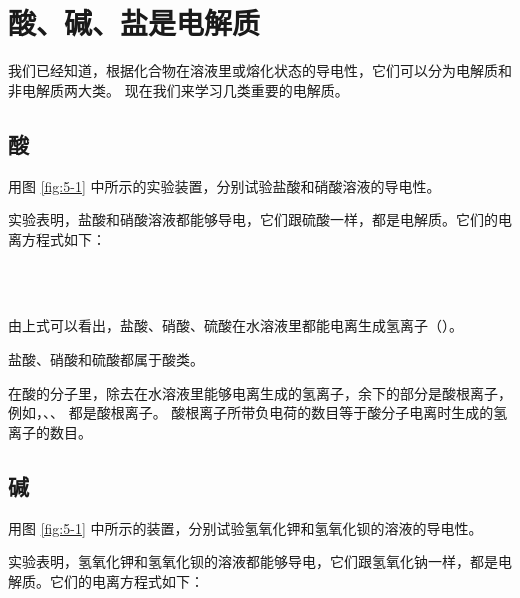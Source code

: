 \section{酸、碱、盐是电解质}\label{sec:5-2}

我们已经知道，根据化合物在溶液里或熔化状态的导电性，它们可以分为电解质和非电解质两大类。
现在我们来学习几类重要的电解质。

\subsection{酸}

\begin{shiyan}
    用图 \ref{fig:5-1} 中所示的实验装置，分别试验盐酸和硝酸溶液的导电性。
\end{shiyan}

实验表明，盐酸和硝酸溶液都能够导电，它们跟硫酸一样，都是电解质。它们的电离方程式如下：
\begin{fangchengshi}
     \\
     \\
\end{fangchengshi}

由上式可以看出，盐酸、硝酸、硫酸在水溶液里都能电离生成氢离子（）。

盐酸、硝酸和硫酸都属于酸类。

在酸的分子里，除去在水溶液里能够电离生成的氢离子，余下的部分是酸根离子，
例如，、、 都是酸根离子。
酸根离子所带负电荷的数目等于酸分子电离时生成的氢离子的数目。


\subsection{碱}

\begin{shiyan}
    用图 \ref{fig:5-1} 中所示的装置，分别试验氢氧化钾和氢氧化钡的溶液的导电性。
\end{shiyan}

实验表明，氢氧化钾和氢氧化钡的溶液都能够导电，它们跟氢氧化钠一样，都是电解质。它们的电离方程式如下：
\begin{fangchengshi}
     \\
     \\
\end{fangchengshi}

